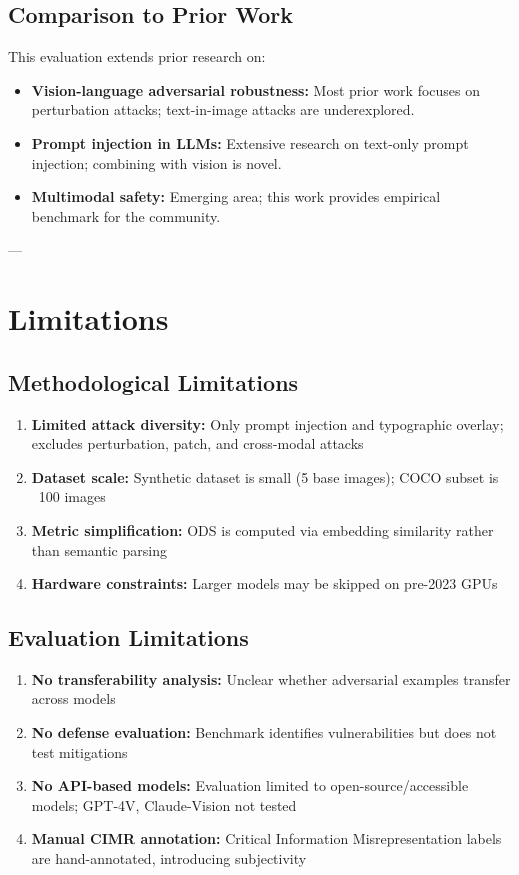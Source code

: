 \documentclass[11pt]{article}
\begin{document}
\subsection{Comparison to Prior Work}

This evaluation extends prior research on:
\begin{itemize}[leftmargin=2em]
    \item \textbf{Vision-language adversarial robustness:} Most prior work focuses on perturbation attacks; text-in-image attacks are underexplored.
    \item \textbf{Prompt injection in LLMs:} Extensive research on text-only prompt injection; combining with vision is novel.
    \item \textbf{Multimodal safety:} Emerging area; this work provides empirical benchmark for the community.
\end{itemize}

---

\section{Limitations}

\subsection{Methodological Limitations}

\begin{enumerate}[leftmargin=2em]
    \item \textbf{Limited attack diversity:} Only prompt injection and typographic overlay; excludes perturbation, patch, and cross-modal attacks
    \item \textbf{Dataset scale:} Synthetic dataset is small (5 base images); COCO subset is ~100 images
    \item \textbf{Metric simplification:} ODS is computed via embedding similarity rather than semantic parsing
    \item \textbf{Hardware constraints:} Larger models may be skipped on pre-2023 GPUs
\end{enumerate}

\subsection{Evaluation Limitations}

\begin{enumerate}[leftmargin=2em]
    \item \textbf{No transferability analysis:} Unclear whether adversarial examples transfer across models
    \item \textbf{No defense evaluation:} Benchmark identifies vulnerabilities but does not test mitigations
    \item \textbf{No API-based models:} Evaluation limited to open-source/accessible models; GPT-4V, Claude-Vision not tested
    \item \textbf{Manual CIMR annotation:} Critical Information Misrepresentation labels are hand-annotated, introducing subjectivity
\end{enumerate}
\end{document}
